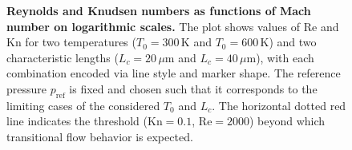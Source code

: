 \begin{figure}
\begin{tikzpicture}
\end{tikzpicture}
\caption{
	\textbf{Reynolds and Knudsen numbers as functions of Mach number on logarithmic scales.}
	The plot shows values of $\mathrm{Re}$ and $\mathrm{Kn}$ for two temperatures ($T_0 = 300\,\mathrm{K}$ and $T_0 = 600\,\mathrm{K}$) and two characteristic lengths ($L_c = 20\,\mu\mathrm{m}$ and $L_c = 40\,\mu\mathrm{m}$), with each combination encoded via line style and marker shape.
	The reference pressure $p_\mathrm{ref}$ is fixed and chosen such that it corresponds to the limiting cases of the considered $T_0$ and $L_c$.
	The horizontal dotted red line indicates the threshold ($\mathrm{Kn} = 0.1$, $\mathrm{Re} = 2000$) beyond which transitional flow behavior is expected.
}
\label{fig:knudsen-reynolds-plot}
\end{figure}

